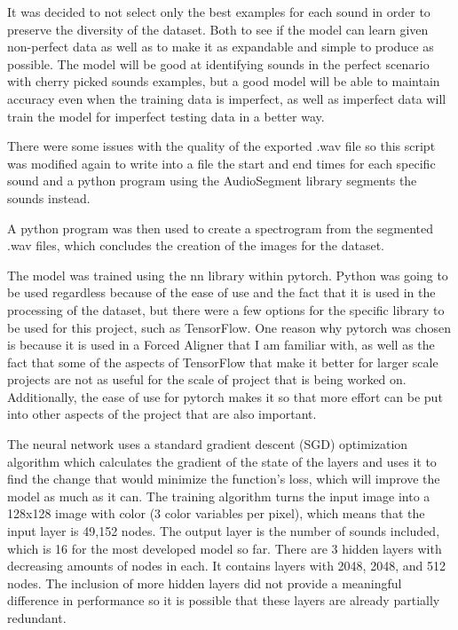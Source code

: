 \documentclass[10pt,twocolumn]{article}
\begin{document}
It was decided to not select only the best examples for each sound in order to preserve the diversity of the dataset. Both to see if the model can learn given non-perfect data as well as to make it as expandable and simple to produce as possible. The model will be good at identifying sounds in the perfect scenario with cherry picked sounds examples, but a good model will be able to maintain accuracy even when the training data is imperfect, as well as imperfect data will train the model for imperfect testing data in a better way.

    
There were some issues with the quality of the exported .wav file so this script was modified again to write into a file the start and end times for each specific sound and a python program using the AudioSegment library segments the sounds instead. 
	
A python program was then used to create a spectrogram from the segmented .wav files, which concludes the creation of the images for the dataset.



The model was trained using the nn library within pytorch. Python was going to be used regardless because of the ease of use and the fact that it is used in the processing of the dataset, but there were a few options for the specific library to be used for this project, such as TensorFlow. One reason why pytorch was chosen is because it is used in a Forced Aligner that I am familiar with, as well as the fact that some of the aspects of TensorFlow that make it better for larger scale projects are not as useful for the scale of project that is being worked on. Additionally, the ease of use for pytorch makes it so that more effort can be put into other aspects of the project that are also important. 

The neural network uses a standard gradient descent (SGD) optimization algorithm which calculates the gradient of the state of the layers and uses it to find the change that would minimize the function’s loss, which will improve the model as much as it can. The training algorithm turns the input image into a 128x128 image with color (3 color variables per pixel), which means that the input layer is 49,152 nodes. The output layer is the number of sounds included, which is 16 for the most developed model so far. There are 3 hidden layers with decreasing amounts of nodes in each. It contains layers with 2048, 2048, and 512 nodes. The inclusion of more hidden layers did not provide a meaningful difference in performance so it is possible that these layers are already partially redundant.
\end{document}
